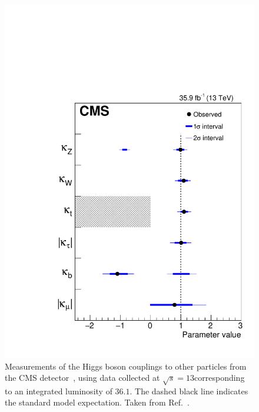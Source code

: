 \begin{figure}[hbtp]
  \begin{center}
    \includegraphics[width=\halflinewidth]{img/cmscombcouplings.pdf}
    \caption{%
        Measurements of the Higgs boson couplings to other particles from the CMS detector~\cite{Sirunyan:2018koj}, using data collected at $\sqrt{s}=13$\TeV corresponding to an integrated luminosity of $36.1$\fbinv.
        The dashed black line indicates the standard model expectation.
        Taken from Ref.~\cite{Sirunyan:2018koj}.
        }
    \label{fig:productiondecay}
  \end{center}
\end{figure}



